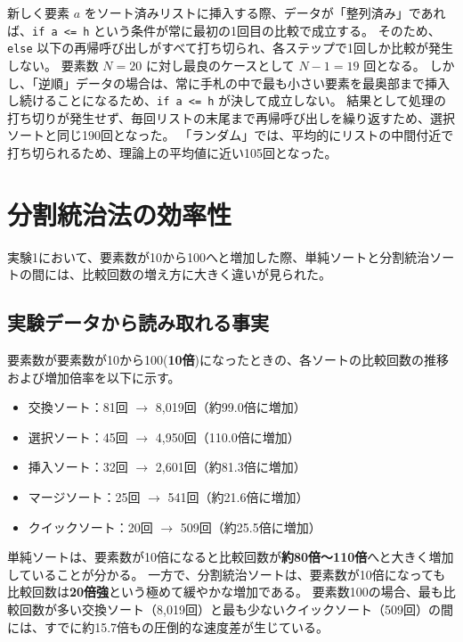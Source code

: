 \documentclass[titlepage]{ltjsarticle}
\begin{document}
新しく要素 $a$ をソート済みリストに挿入する際、データが「整列済み」であれば、\texttt{if a <= h} という条件が常に最初の1回目の比較で成立する。
そのため、\texttt{else} 以下の再帰呼び出しがすべて打ち切られ、各ステップで1回しか比較が発生しない。
要素数 $N=20$ に対し最良のケースとして $N-1 = 19$ 回となる。
しかし、「逆順」データの場合は、常に手札の中で最も小さい要素を最奥部まで挿入し続けることになるため、\texttt{if a <= h} が決して成立しない。
結果として処理の打ち切りが発生せず、毎回リストの末尾まで再帰呼び出しを繰り返すため、選択ソートと同じ190回となった。
「ランダム」では、平均的にリストの中間付近で打ち切られるため、理論上の平均値に近い105回となった。

\clearpage

\section{分割統治法の効率性}
実験1において、要素数が10から100へと増加した際、単純ソートと分割統治ソートの間には、比較回数の増え方に大きく違いが見られた。

\subsection{実験データから読み取れる事実}
要素数が要素数が10から100(\textbf{10倍})になったときの、各ソートの比較回数の推移および増加倍率を以下に示す。

\begin{itemize}
    \item 交換ソート：81回 $\rightarrow$ 8,019回（約99.0倍に増加）
    \item 選択ソート：45回 $\rightarrow$ 4,950回（110.0倍に増加）
    \item 挿入ソート：32回 $\rightarrow$ 2,601回（約81.3倍に増加）
    \item マージソート：25回 $\rightarrow$ 541回（約21.6倍に増加）
    \item クイックソート：20回 $\rightarrow$ 509回（約25.5倍に増加）
\end{itemize}

単純ソートは、要素数が10倍になると比較回数が\textbf{約80倍〜110倍}へと大きく増加していることが分かる。
一方で、分割統治ソートは、要素数が10倍になっても比較回数は\textbf{20倍強}という極めて緩やかな増加である。
要素数100の場合、最も比較回数が多い交換ソート（8,019回）と最も少ないクイックソート（509回）の間には、すでに約15.7倍もの圧倒的な速度差が生じている。
\end{document}

